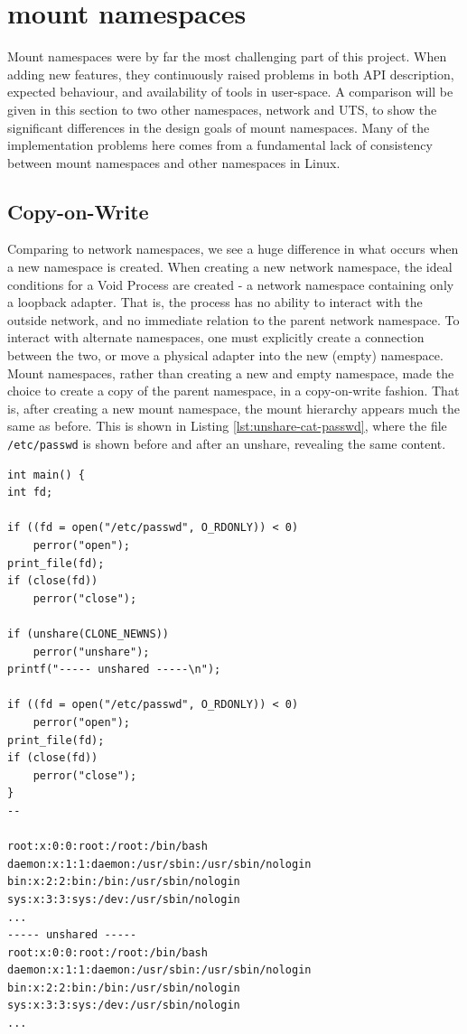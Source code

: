 \documentclass[12pt,a4paper,twoside]{report}
\begin{document}

\section{mount namespaces}
\label{sec:voiding-mount}

Mount namespaces were by far the most challenging part of this project. When adding new features, they continuously raised problems in both API description, expected behaviour, and availability of tools in user-space. A comparison will be given in this section to two other namespaces, network and UTS, to show the significant differences in the design goals of mount namespaces. Many of the implementation problems here comes from a fundamental lack of consistency between mount namespaces and other namespaces in Linux.

\subsection{Copy-on-Write}

Comparing to network namespaces, we see a huge difference in what occurs when a new namespace is created. When creating a new network namespace, the ideal conditions for a Void Process are created - a network namespace containing only a loopback adapter. That is, the process has no ability to interact with the outside network, and no immediate relation to the parent network namespace. To interact with alternate namespaces, one must explicitly create a connection between the two, or move a physical adapter into the new (empty) namespace. Mount namespaces, rather than creating a new and empty namespace, made the choice to create a copy of the parent namespace, in a copy-on-write fashion. That is, after creating a new mount namespace, the mount hierarchy appears much the same as before. This is shown in Listing \ref{lst:unshare-cat-passwd}, where the file \texttt{/etc/passwd} is shown before and after an unshare, revealing the same content.

\begin{lstlisting}[float,label={lst:unshare-cat-passwd}]
int main() {
int fd;

if ((fd = open("/etc/passwd", O_RDONLY)) < 0)
    perror("open");
print_file(fd);
if (close(fd))
    perror("close");

if (unshare(CLONE_NEWNS))
    perror("unshare");
printf("----- unshared -----\n");

if ((fd = open("/etc/passwd", O_RDONLY)) < 0)
    perror("open");
print_file(fd);
if (close(fd))
    perror("close");
}
--

root:x:0:0:root:/root:/bin/bash
daemon:x:1:1:daemon:/usr/sbin:/usr/sbin/nologin
bin:x:2:2:bin:/bin:/usr/sbin/nologin
sys:x:3:3:sys:/dev:/usr/sbin/nologin
...
----- unshared -----
root:x:0:0:root:/root:/bin/bash
daemon:x:1:1:daemon:/usr/sbin:/usr/sbin/nologin
bin:x:2:2:bin:/bin:/usr/sbin/nologin
sys:x:3:3:sys:/dev:/usr/sbin/nologin
...
\end{lstlisting}
\end{document}
